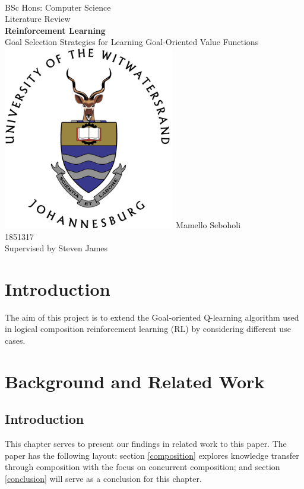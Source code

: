 \documentclass[11pt]{report}
\begin{document}
\onecolumn
\thispagestyle{empty}

\
\begin{center}
    \vfill
    \LARGE BSc Hons: Computer Science\\[10pt]
    \LARGE Literature Review\\[30pt]
    \LARGE \textbf{Reinforcement Learning}\\[10pt]
    \LARGE Goal Selection Strategies for Learning Goal-Oriented Value Functions\\
    \vfill
    \includegraphics[width=7.5cm]{images/wits-logo.png}
    \vfill
    \Large Mamello Seboholi\\
    \Large 1851317\\[10pt]
    \Large Supervised by Steven James\\
    \vfill
\end{center}

\chapter{Introduction}
The aim of this project is to extend the Goal-oriented Q-learning algorithm used in logical composition reinforcement 
learning (RL) by considering different use cases.

\chapter{Background and Related Work}

\section{Introduction}
This chapter serves to present our findings in related work to this paper. The paper has the following layout: section 
\ref{composition} explores knowledge transfer through composition with the focus on concurrent composition; and section 
\ref{conclusion} will serve as a conclusion for this chapter.
\end{document}
